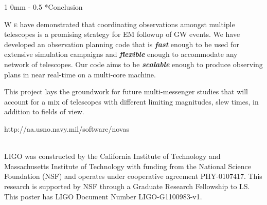 \documentclass[landscape]{a0poster}
\makeatletter
\newcommand{\dropcap}[2]{\lettrine{\fontspec{Copse}#1}{\textnormal{ #2}}}
\renewcommand{\section}{\@startsection
{section}%
{1}%
{0mm}%
{-\baselineskip}%
{0.5\baselineskip}%
{\fontspec{Marvel Bold}\Huge}} %
\renewcommand{\emph}[1]{{\bfseries\itshape#1}}
\makeatother
\begin{document}
\framebreak

\section*{Conclusion}

\dropcap{W}{e} have demonstrated that coordinating observations amongst multiple telescopes is a promising strategy for EM followup of GW events.  We have developed an observation planning code that is \emph{fast} enough to be used for extensive simulation campaigns and \emph{flexible} enough to accommodate any network of telescopes.  Our code aims to be \emph{scalable} enough to produce observing plans in near real-time on a multi-core machine.

This project lays the groundwork for future multi-messenger studies that will account for a mix of telescopes with different limiting magnitudes, slew times, in addition to fields of view.



\noindent
http://aa.usno.navy.mil/software/novas

\noindent\\
LIGO was constructed by the California Institute of Technology and Massachusetts Institute of Technology with funding from the National Science Foundation (NSF) and operates under cooperative agreement PHY-0107417.  This research is supported by NSF through a Graduate Research Fellowship to LS.  This poster has LIGO Document Number LIGO-G1100983-v1.
\end{document}
